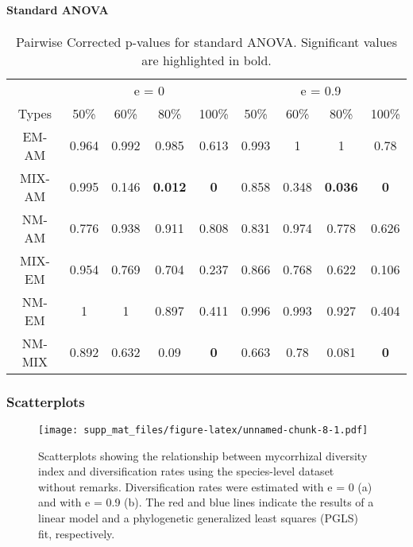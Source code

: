 \documentclass[]{article}
\let\oldparagraph\paragraph
\renewcommand{\paragraph}[1]{\oldparagraph{#1}\mbox{}}
\begin{document}
\hypertarget{standard-anova-1}{%
\paragraph{Standard ANOVA}\label{standard-anova-1}}

\begin{table}[H]

\caption{\label{tab:unnamed-chunk-7}Pairwise Corrected p-values for standard ANOVA. Significant values are highlighted in bold.}
\centering
\begin{tabular}{c|c|c|c|c|c|c|c|c}
\hline
\multicolumn{1}{c|}{ } & \multicolumn{4}{c|}{e = 0} & \multicolumn{4}{c}{e = 0.9} \\
\cline{2-5} \cline{6-9}
Types & 50\% & 60\% & 80\% & 100\% & 50\% & 60\% & 80\% & 100\%\\
\hline
EM-AM & 0.964 & 0.992 & 0.985 & 0.613 & 0.993 & 1 & 1 & 0.78\\
\hline
MIX-AM & 0.995 & 0.146 & \textbf{0.012} & \textbf{0} & 0.858 & 0.348 & \textbf{0.036} & \textbf{0}\\
\hline
NM-AM & 0.776 & 0.938 & 0.911 & 0.808 & 0.831 & 0.974 & 0.778 & 0.626\\
\hline
MIX-EM & 0.954 & 0.769 & 0.704 & 0.237 & 0.866 & 0.768 & 0.622 & 0.106\\
\hline
NM-EM & 1 & 1 & 0.897 & 0.411 & 0.996 & 0.993 & 0.927 & 0.404\\
\hline
NM-MIX & 0.892 & 0.632 & 0.09 & \textbf{0} & 0.663 & 0.78 & 0.081 & \textbf{0}\\
\hline
\end{tabular}
\end{table}

\hypertarget{scatterplots}{%
\subsubsection{Scatterplots}\label{scatterplots}}

\begin{figure}
\centering
\texttt{[image: supp\_mat\_files/figure-latex/unnamed-chunk-8-1.pdf]}
\caption{Scatterplots showing the relationship between mycorrhizal
diversity index and diversification rates using the species-level
dataset without remarks. Diversification rates were estimated with e = 0
(a) and with e = 0.9 (b). The red and blue lines indicate the results of
a linear model and a phylogenetic generalized least squares (PGLS) fit,
respectively.}
\end{figure}
\end{document}

